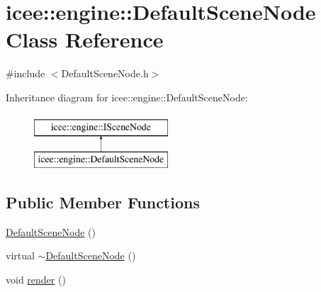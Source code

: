 \hypertarget{classicee_1_1engine_1_1DefaultSceneNode}{
\section{icee::engine::DefaultSceneNode Class Reference}
\label{classicee_1_1engine_1_1DefaultSceneNode}
}


{\ttfamily \#include $<$DefaultSceneNode.h$>$}

Inheritance diagram for icee::engine::DefaultSceneNode:\begin{figure}[H]
\begin{center}
\leavevmode
\includegraphics[height=2.000000cm]{classicee_1_1engine_1_1DefaultSceneNode}
\end{center}
\end{figure}
\subsection*{Public Member Functions}
\begin{DoxyCompactItemize}
\item 
\hyperlink{classicee_1_1engine_1_1DefaultSceneNode_ae6bf144b0f6618bb575a1563345b984d}{DefaultSceneNode} ()
\item 
virtual \hyperlink{classicee_1_1engine_1_1DefaultSceneNode_a0f7bc7135132e6d1488927b233b505a9}{$\sim$DefaultSceneNode} ()
\item 
void \hyperlink{classicee_1_1engine_1_1DefaultSceneNode_aed9092adb48382ec5423f7d2224d8fef}{render} ()
\end{DoxyCompactItemize}


